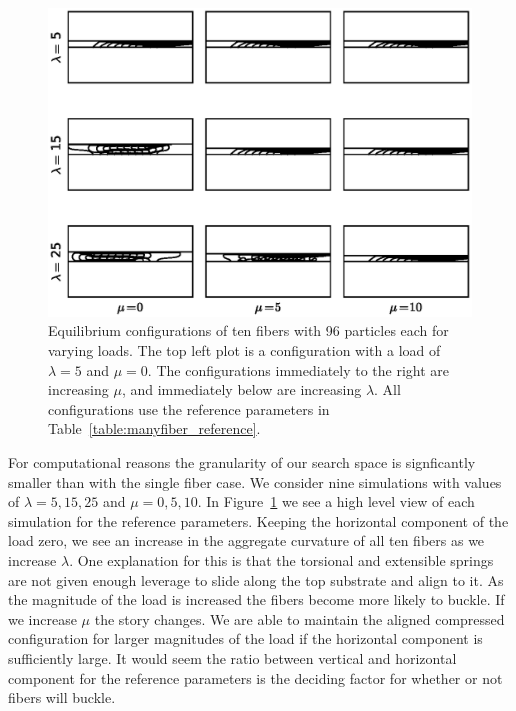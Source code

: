 	\begin{figure}
		\begin{center}
			\includegraphics[scale=1]{./fig/ch4/grid.eps}
		\end{center}		
		\caption{Equilibrium configurations of ten fibers with 96 particles each for varying loads. The top left plot is a configuration with a load of $\lambda = 5$ and $\mu = 0$. The configurations immediately to the right are increasing $\mu$, and immediately below are increasing $\lambda$. All configurations use the reference parameters in Table~\ref{table:manyfiber_reference}.
		\label{fig:grid}}
	\end{figure}
	
	For computational reasons the granularity of our search space is signficantly smaller than with the single fiber case. We consider nine simulations with values of $\lambda = 5, 15, 25$ and $\mu = 0, 5, 10$. In Figure~\ref{fig:grid} we see a high level view of each simulation for the reference parameters. Keeping the horizontal component of the load zero, we see an increase in the aggregate curvature of all ten fibers as we increase $\lambda$. One explanation for this is that the torsional and extensible springs are not given enough leverage to slide along the top substrate and align to it. As the magnitude of the load is increased the fibers become more likely to buckle. If we increase $\mu$ the story changes. We are able to maintain the aligned compressed configuration for larger magnitudes of the load if the horizontal component is sufficiently large. It would seem the ratio between vertical and horizontal component for the reference parameters is the deciding factor for whether or not fibers will buckle.

